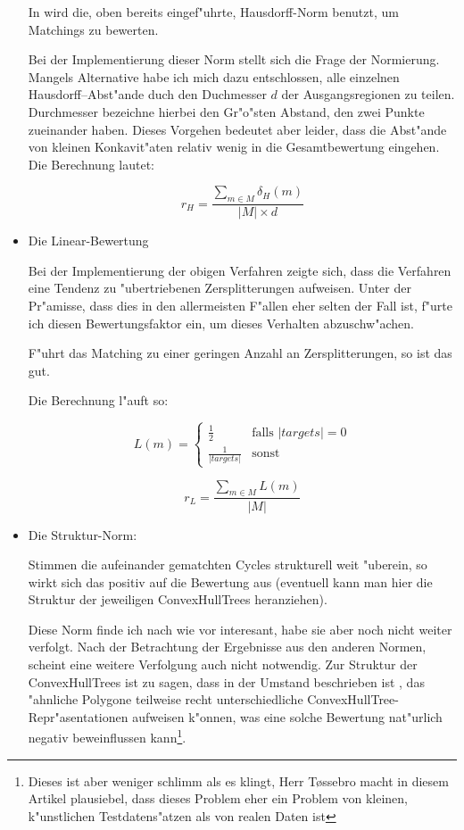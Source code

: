 \begin{itemize}
In \cite{AAR} wird die,  oben bereits eingef"uhrte, Hausdorff-Norm benutzt, um Matchings zu bewerten. 

Bei der Implementierung dieser Norm stellt sich die Frage der Normierung. Mangels Alternative habe ich mich dazu entschlossen, alle einzelnen Hausdorff--Abst"ande duch den Duchmesser $d$ der Ausgangsregionen zu teilen.  Durchmesser bezeichne hierbei den Gr"o"sten Abstand, den zwei Punkte zueinander haben. Dieses Vorgehen bedeutet aber leider, dass die Abst"ande von kleinen Konkavit"aten relativ wenig in die Gesamtbewertung eingehen. Die Berechnung lautet:

$$r_H=\frac{\sum_{m\in M}\delta_H(m)}{|M|\times d}$$


\item Die Linear-Bewertung

Bei der Implementierung der obigen Verfahren zeigte sich, dass die Verfahren eine Tendenz zu "ubertriebenen Zersplitterungen aufweisen. Unter der Pr"amisse, dass dies in den allermeisten F"allen eher selten der Fall ist, f"urte ich diesen Bewertungsfaktor ein, um dieses Verhalten abzuschw"achen.

F"uhrt das Matching zu einer geringen Anzahl an Zersplitterungen, so ist das gut.

Die Berechnung l"auft so:

$$L(m)=
\begin{cases}
	\frac{1}{2} & \text{falls }|targets|=0\\
	\frac{1}{|targets|} & \text{sonst}
    \end{cases}
$$

$$r_L=\frac{\sum_{m\in M}L(m)}{|M|}$$

\item Die Struktur-Norm:

Stimmen die aufeinander gematchten Cycles strukturell weit "uberein, so wirkt sich das positiv auf die Bewertung aus (eventuell kann man hier die Struktur der jeweiligen ConvexHullTrees heranziehen).

Diese Norm finde ich nach wie vor interesant, habe sie aber noch nicht weiter verfolgt. Nach der Betrachtung der Ergebnisse aus den anderen Normen, scheint eine weitere Verfolgung auch nicht notwendig. Zur Struktur der ConvexHullTrees ist zu sagen, dass in \cite{TG} der Umstand beschrieben ist , das "ahnliche Polygone teilweise recht unterschiedliche ConvexHullTree-Repr"asentationen aufweisen k"onnen, was eine solche Bewertung nat"urlich negativ beweinflussen kann\footnote{Dieses ist aber weniger schlimm als es klingt, Herr T\o{}ssebro macht in diesem Artikel plausiebel, dass dieses Problem eher ein Problem von kleinen, k"unstlichen Testdatens"atzen als von realen Daten ist}.


\end{itemize} 

